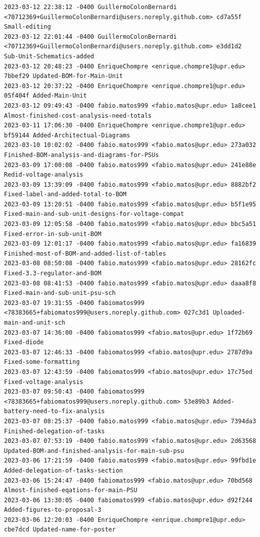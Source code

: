 \documentclass[12pt]{article}
\begin{document}
\begin{lstlisting}
2023-03-12 22:38:12 -0400 GuillermoColonBernardi <70712369+GuillermoColonBernardi@users.noreply.github.com> cd7a55f Small-editing
2023-03-12 22:01:44 -0400 GuillermoColonBernardi <70712369+GuillermoColonBernardi@users.noreply.github.com> e3dd1d2 Sub-Unit-Schematics-added
2023-03-12 20:48:23 -0400 EnriqueChompre <enrique.chompre1@upr.edu> 7bbef29 Updated-BOM-for-Main-Unit
2023-03-12 20:37:22 -0400 EnriqueChompre <enrique.chompre1@upr.edu> 05f404f Added-Main-Unit
2023-03-12 09:49:43 -0400 fabio.matos999 <fabio.matos@upr.edu> 1a8cee1 Almost-finished-cost-analysis-need-totals
2023-03-11 17:06:30 -0400 EnriqueChompre <enrique.chompre1@upr.edu> bf59144 Added-Architectual-Diagrams
2023-03-10 10:02:02 -0400 fabio.matos999 <fabio.matos@upr.edu> 273a032 Finished-BOM-analysis-and-diagrams-for-PSUs
2023-03-09 17:00:08 -0400 fabio.matos999 <fabio.matos@upr.edu> 241e88e Redid-voltage-analysis
2023-03-09 13:39:09 -0400 fabio.matos999 <fabio.matos@upr.edu> 8882bf2 Fixed-label-and-added-total-to-BOM
2023-03-09 13:20:51 -0400 fabio.matos999 <fabio.matos@upr.edu> b5f1e95 Fixed-main-and-sub-unit-designs-for-voltage-compat
2023-03-09 12:05:58 -0400 fabio.matos999 <fabio.matos@upr.edu> bbc5a51 Fixed-error-in-sub-unit-BOM
2023-03-09 12:01:17 -0400 fabio.matos999 <fabio.matos@upr.edu> fa16839 Finished-most-of-BOM-and-added-list-of-tables
2023-03-08 08:50:08 -0400 fabio.matos999 <fabio.matos@upr.edu> 28162fc Fixed-3.3-regulator-and-BOM
2023-03-08 08:41:53 -0400 fabio.matos999 <fabio.matos@upr.edu> daaa8f8 Fixed-main-and-sub-unit-psu-sch
2023-03-07 19:31:55 -0400 fabiomatos999 <78383665+fabiomatos999@users.noreply.github.com> 027c3d1 Uploaded-main-and-unit-sch
2023-03-07 14:36:00 -0400 fabiomatos999 <fabio.matos@upr.edu> 1f72b69 Fixed-diode
2023-03-07 12:46:33 -0400 fabiomatos999 <fabio.matos@upr.edu> 2787d9a Fixed-some-formatting
2023-03-07 12:43:59 -0400 fabiomatos999 <fabio.matos@upr.edu> 17c75ed Fixed-voltage-analysis
2023-03-07 09:50:43 -0400 fabiomatos999 <78383665+fabiomatos999@users.noreply.github.com> 53e89b3 Added-battery-need-to-fix-analysis
2023-03-07 08:25:37 -0400 fabio.matos999 <fabio.matos@upr.edu> 7394da3 Finished-delegation-of-tasks
2023-03-07 07:53:19 -0400 fabio.matos999 <fabio.matos@upr.edu> 2d63568 Updated-BOM-and-finished-analysis-for-main-sub-psu
2023-03-06 17:21:59 -0400 fabio.matos999 <fabio.matos@upr.edu> 99fbd1e Added-delegation-of-tasks-section
2023-03-06 15:24:47 -0400 fabiomatos999 <fabio.matos@upr.edu> 70bd568 Almost-finished-eqations-for-main-PSU
2023-03-06 13:30:05 -0400 fabiomatos999 <fabio.matos@upr.edu> d92f244 Added-figures-to-proposal-3
2023-03-06 12:20:03 -0400 EnriqueChompre <enrique.chompre1@upr.edu> cbe7dcd Updated-name-for-poster

\end{lstlisting}
\end{document}
